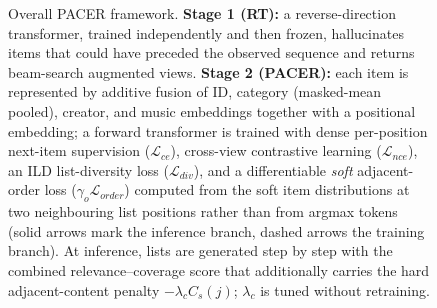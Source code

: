 \begin{figure}[t!]
{\begin{tikzpicture}
\end{tikzpicture}%
}
\caption{Overall PACER framework. \textbf{Stage 1 (RT):} a reverse-direction
transformer, trained independently and then frozen, hallucinates items that
could have preceded the observed sequence and returns beam-search augmented
views. \textbf{Stage 2 (PACER):} each item is represented by additive fusion of
ID, category (masked-mean pooled), creator, and music embeddings together with
a positional embedding; a forward transformer is trained with dense
per-position next-item supervision ($\mathcal L_{ce}$), cross-view contrastive
learning ($\mathcal L_{nce}$), an ILD list-diversity loss
($\mathcal L_{div}$), and a differentiable \emph{soft} adjacent-order loss
($\gamma_o\mathcal L_{order}$) computed from the soft item distributions at two
neighbouring list positions rather than from argmax tokens (solid arrows mark
the inference branch, dashed arrows the training branch). At inference, lists
are generated step by step with the combined relevance--coverage score that
additionally carries the hard adjacent-content penalty $-\lambda_c C_s(j)$;
$\lambda_c$ is tuned without retraining.}
\label{fig:pacer_framework}
\end{figure}
